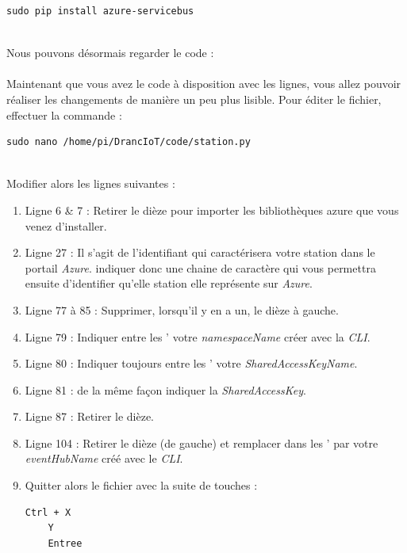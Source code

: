 \begin{lstlisting}[style=MyBashStyle]
	sudo pip install azure-servicebus
\end{lstlisting}\\

Nous pouvons désormais regarder le code :\\ 
\newpage
{}\\

Maintenant que vous avez le code à disposition avec les lignes, vous allez pouvoir réaliser les changements de manière un peu plus lisible. Pour éditer le fichier, effectuer la commande :

\begin{lstlisting}[style=MyBashStyle]
	sudo nano /home/pi/DrancIoT/code/station.py
\end{lstlisting}\\

Modifier alors les lignes suivantes : 
\begin{enumerate}
	\item Ligne 6 & 7 : Retirer le dièze pour importer les bibliothèques azure que vous venez d'installer.
	\item Ligne 27 : Il s'agit de l'identifiant qui caractérisera votre station dans le portail \textit{Azure}. indiquer donc une chaine de caractère qui vous permettra ensuite d'identifier qu'elle station elle représente sur \textit{Azure}.
	\item Ligne 77 à 85 : Supprimer, lorsqu'il y en a un, le dièze à gauche.
	\item Ligne 79 : Indiquer entre les ' votre \textit{namespaceName} créer avec la \textit{CLI}.
	\item Ligne 80 : Indiquer toujours entre les ' votre \textit{SharedAccessKeyName}.
	\item Ligne 81 : de la même façon indiquer la \textit{SharedAccessKey}.
	\item Ligne 87 : Retirer le dièze.
	\item Ligne 104 : Retirer le dièze (de gauche) et remplacer dans les ' par votre \textit{eventHubName} créé avec le \textit{CLI}. 
	\item Quitter alors le fichier avec la suite de touches :\\
	\begin{lstlisting}[style=MyBashStyle]
	Ctrl + X
	Y
	Entree
\end{lstlisting}\\
\end{enumerate}

